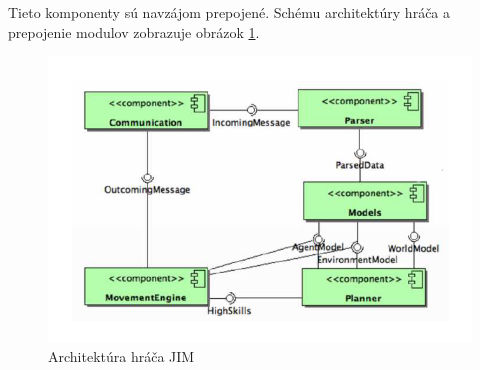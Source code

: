 Tieto komponenty sú navzájom prepojené. Schému architektúry hráča a prepojenie modulov zobrazuje obrázok \ref{pic_jim_architecture}.

\begin{figure}[H]
	\center
	\includegraphics[scale=1]{./data/jim_architecture}
	\caption{Architektúra hráča JIM \cite{durcak}}
	\label{pic_jim_architecture}
\end{figure}